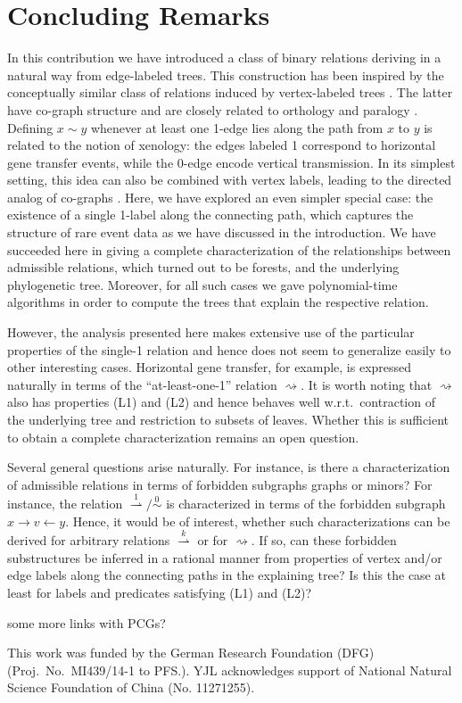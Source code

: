 \documentclass[smallextended]{svjour3}
\let\cite\citep
\newcommand{\TODO}[1]{\begingroup\color{red}#1\endgroup}
\newcommand{\Ro}{\mathrel{\overset{0}{\sim}}}
\newcommand{\Rld}{\mathrel{\overset{1}{\rightharpoonup}}}
\newcommand{\Rldk}{\mathrel{\overset{k}{\rightharpoonup}}}
\newcommand{\Rd}{\mathrel{\rightsquigarrow}}
\begin{document}
\section{Concluding Remarks} 

In this contribution we have introduced a class of binary relations
deriving in a natural way from edge-labeled trees. This construction has
been inspired by the conceptually similar class of relations induced by
vertex-labeled trees \cite{HW:17}.  The latter have co-graph structure and
are closely related to orthology and paralogy
\cite{Hellmuth:13a,Lafond:14,Hellmuth:15a,HW:15}. Defining $x\sim y$
whenever at least one 1-edge lies along the path from $x$ to $y$ is related
to the notion of xenology: the edges labeled 1 correspond to horizontal
gene transfer events, while the 0-edge encode vertical transmission. In its
simplest setting, this idea can also be combined with vertex labels,
leading to the directed analog of co-graphs \cite{HSW:16}. Here, we have
explored an even simpler special case: the existence of a single 1-label
along the connecting path, which captures the structure of rare event data
as we have discussed in the introduction.  We have succeeded here in giving
a complete characterization of the relationships between admissible
relations, which turned out to be forests, and the underlying phylogenetic
tree.  Moreover, for all such cases we gave polynomial-time algorithms in
order to compute the trees that explain the respective relation.

However, the analysis presented here makes extensive use of the particular
properties of the single-1 relation and hence does not seem to generalize
easily to other interesting cases. Horizontal gene transfer, for example,
is expressed naturally in terms of the ``at-least-one-1'' relation
$\Rd$. It is worth noting that $\Rd$ also has properties (L1) and (L2) and
hence behaves well w.r.t.\ contraction of the underlying tree and
restriction to subsets of leaves. Whether this is sufficient to obtain a
complete characterization remains an open question.

Several general questions arise naturally. For instance, is there a
characterization of admissible relations in terms of forbidden subgraphs
graphs or minors? For instance, the relation $\Rld/\Ro$ is characterized in
terms of the forbidden subgraph $x\rightarrow v \leftarrow y$. Hence, it
would be of interest, whether such characterizations can be derived for
arbitrary relations $\Rldk$ or for $\Rd$.  If so, can these forbidden
substructures be inferred in a rational manner from properties of vertex
and/or edge labels along the connecting paths in the explaining tree?
Is this the case at least for labels and predicates satisfying (L1)
  and (L2)?

\TODO{some more links with PCGs?} 


\begin{acknowledgements}
  This work was funded by the German Research Foundation (DFG) (Proj.\ No.\
  MI439/14-1 to PFS.).  YJL acknowledges support of National Natural
  Science Foundation of China (No. 11271255).
\end{acknowledgements}

%
%
%

\end{document}
